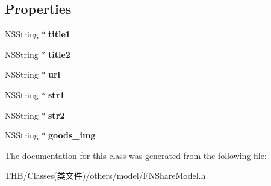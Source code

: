 \subsection*{Properties}
\begin{DoxyCompactItemize}
\item 
\mbox{\label{interface_f_n_share_model_aec04a7f3d7fa082023daf2fa30224fc4}} 
N\+S\+String $\ast$ {\bfseries title1}
\item 
\mbox{\label{interface_f_n_share_model_a7d2256399def9c7ffb40a5e7d8092932}} 
N\+S\+String $\ast$ {\bfseries title2}
\item 
\mbox{\label{interface_f_n_share_model_ab36130c66552a397a1f4f5d5b6266a77}} 
N\+S\+String $\ast$ {\bfseries url}
\item 
\mbox{\label{interface_f_n_share_model_a39f6c42825f4738d681dfb24078572d0}} 
N\+S\+String $\ast$ {\bfseries str1}
\item 
\mbox{\label{interface_f_n_share_model_ae7222d6462be3f46572d9b587cfa3a67}} 
N\+S\+String $\ast$ {\bfseries str2}
\item 
\mbox{\label{interface_f_n_share_model_aa0abf8e5a528a35812c812557fd2c4d8}} 
N\+S\+String $\ast$ {\bfseries goods\+\_\+img}
\end{DoxyCompactItemize}


The documentation for this class was generated from the following file\+:\begin{DoxyCompactItemize}
\item 
T\+H\+B/\+Classes(类文件)/others/model/F\+N\+Share\+Model.\+h\end{DoxyCompactItemize}
